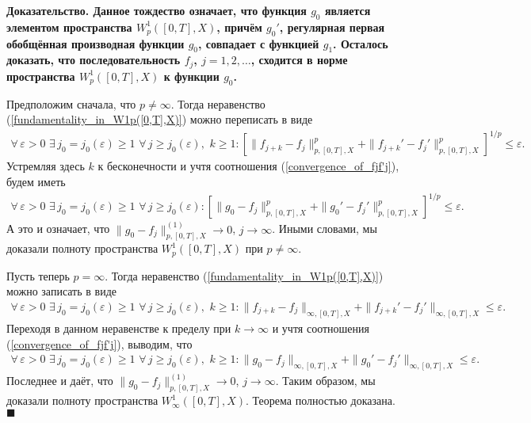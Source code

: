 \documentclass{report}
\newenvironment{Proof}{\par\noindent\bf Доказательство.\rm}{ $\blacksquare$\par}
\begin{document}
\begin{Proof}
Данное тождество означает, что функция $g_0$ является элементом пространства $W^1_p([0,T],X)$, причём  $g_0'$, регулярная первая обобщённая производная функции $g_0$, совпадает с функцией
 $g_1$. Осталось доказать, что последовательность $f_j$, $j=1,2,\dots$, сходится в норме пространства $W^1_p([0,T],X)$ к функции $g_0$.

Предположим сначала, что $p\neq\infty$. Тогда неравенство (\ref{fundamentality_in_W1p([0,T],X)}) можно переписать в виде
\begin{gather*}
\forall\,\varepsilon>0\,\,\exists\,j_0=j_0(\varepsilon)\geqslant1\,\,\forall\,j\geqslant j_0(\varepsilon),\,\,k\geqslant1:
[\|f_{j+k}-f_j\|_{p,[0,T],X}^p+\|f_{j+k}'-f_j'\|_{p,[0,T],X}^p]^{1/p}\leqslant\varepsilon.
\end{gather*}
Устремляя здесь $k$ к бесконечности и учтя соотношения (\ref{convergence_of_fjf'j}), будем иметь
\begin{gather*}
\forall\,\varepsilon>0\,\,\exists\,j_0=j_0(\varepsilon)\geqslant1\,\,\forall\,j\geqslant j_0(\varepsilon):[\|g_{0}-f_j\|_{p,[0,T],X}^p+\|g_{0}'-f_j'\|_{p,[0,T],X}^p]^{1/p}\leqslant
\varepsilon.
\end{gather*}
А это и означает, что $\|g_{0}-f_j\|_{p,[0,T],X}^{(1)}\to0$, $j\to\infty$. Иными словами, мы доказали полноту пространства $W^1_p([0,T],X)$ при $p\neq\infty$.

Пусть теперь $p=\infty$. Тогда неравенство (\ref{fundamentality_in_W1p([0,T],X)}) можно записать в виде
\begin{gather*}
\forall\,\varepsilon>0\,\,\exists\,j_0=j_0(\varepsilon)\geqslant1\,\,\forall\,j\geqslant j_0(\varepsilon),\,\,k\geqslant1:
\|f_{j+k}-f_j\|_{\infty,[0,T],X}+\|f_{j+k}'-f_j'\|_{\infty,[0,T],X}\leqslant\varepsilon.
\end{gather*}
Переходя в данном неравенстве к пределу при $k\to\infty$ и учтя соотношения (\ref{convergence_of_fjf'j}), выводим, что
\begin{gather*}
\forall\,\varepsilon>0\,\,\exists\,j_0=j_0(\varepsilon)\geqslant1\,\,\forall\,j\geqslant j_0(\varepsilon),\,\,k\geqslant1:
\|g_{0}-f_j\|_{\infty,[0,T],X}+\|g_{0}'-f_j'\|_{\infty,[0,T],X}\leqslant\varepsilon.
\end{gather*}
Последнее и даёт, что $\|g_{0}-f_j\|_{p,[0,T],X}^{(1)}\to0$, $j\to\infty$. Таким образом, мы доказали полноту пространства  $W^1_\infty([0,T],X)$. Теорема полностью доказана.
\end{Proof}
\end{document}

